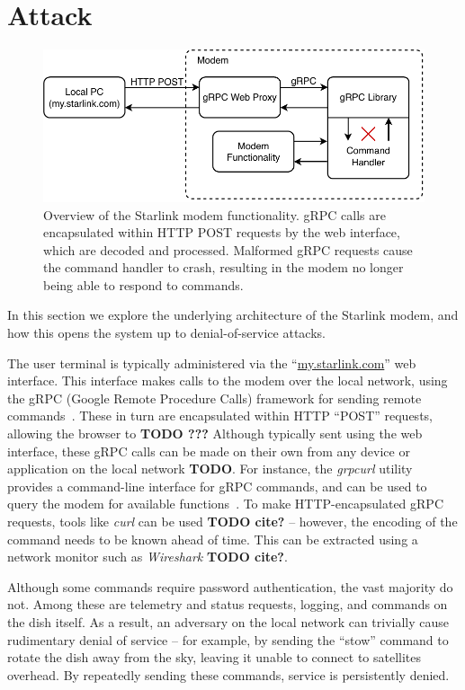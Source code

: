 \section{Attack}\label{sec:attack}

\begin{figure}
    \centering\includegraphics[width=\columnwidth]{img/modem.pdf}
    \caption{Overview of the Starlink modem functionality. gRPC calls are encapsulated within HTTP POST requests by the web interface, which are decoded and processed. Malformed gRPC requests cause the command handler to crash, resulting in the modem no longer being able to respond to commands.}
    \label{fig:modem}
\end{figure}

In this section we explore the underlying architecture of the Starlink modem, and how this opens the system up to denial-of-service attacks.

The user terminal is typically administered via the ``\url{my.starlink.com}'' web interface.
This interface makes calls to the modem over the local network, using the gRPC (Google Remote Procedure Calls) framework for sending remote commands~\cite{gRPC}.
These in turn are encapsulated within HTTP ``POST'' requests, allowing the browser to \textbf{TODO ???}
Although typically sent using the web interface, these gRPC calls can be made on their own from any device or application on the local network \textbf{TODO}.
For instance, the \textit{grpcurl} utility provides a command-line interface for gRPC commands, and can be used to query the modem for available functions~\cite{gRPCurl}.
To make HTTP-encapsulated gRPC requests, tools like \textit{curl} can be used \textbf{TODO cite?} -- however, the encoding of the command needs to be known ahead of time.
This can be extracted using a network monitor such as \textit{Wireshark} \textbf{TODO cite?}.

Although some commands require password authentication, the vast majority do not.
Among these are telemetry and status requests, logging, and commands on the dish itself.
As a result, an adversary on the local network can trivially cause rudimentary denial of service -- for example, by sending the ``stow'' command to rotate the dish away from the sky, leaving it unable to connect to satellites overhead.
By repeatedly sending these commands, service is persistently denied.

